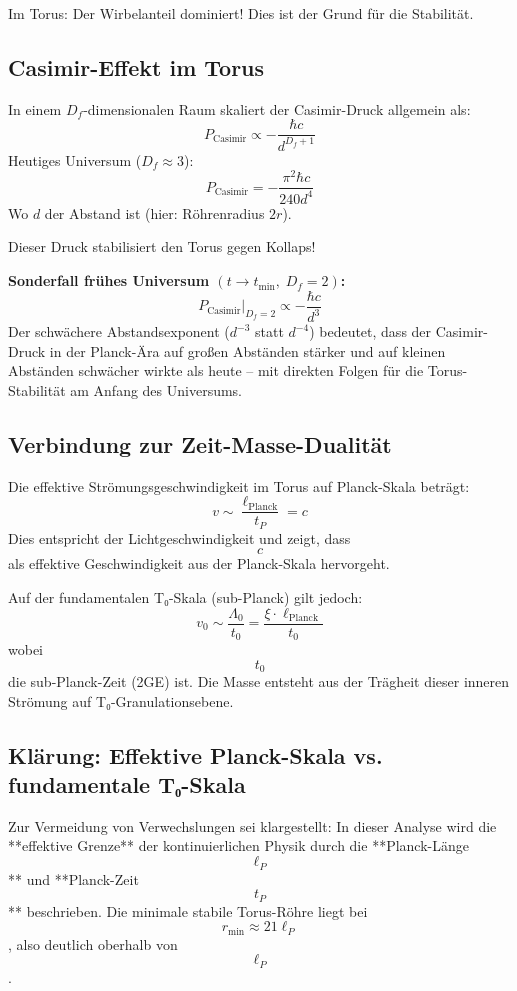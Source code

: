	Im Torus: Der Wirbelanteil dominiert! Dies ist der Grund für die Stabilität.
	
	\subsection{Casimir-Effekt im Torus}
	In einem $D_f$-dimensionalen Raum skaliert der Casimir-Druck allgemein als:
	\[
	P_{\text{Casimir}} \propto -\frac{\hbar c}{d^{D_f+1}}
	\]
	Heutiges Universum (\( D_f \approx 3 \)):
	\[
	P_{\text{Casimir}} = -\frac{\pi^2 \hbar c}{240 d^4}
	\]
	Wo \( d \) der Abstand ist (hier: Röhrenradius \( 2r \)).

	Dieser Druck stabilisiert den Torus gegen Kollaps!

	\textbf{Sonderfall frühes Universum \((t \to t_{\min},\; D_f = 2)\):}
	\[
	P_{\text{Casimir}}\big|_{D_f=2} \propto -\frac{\hbar c}{d^3}
	\]
	Der schwächere Abstandsexponent ($d^{-3}$ statt $d^{-4}$) bedeutet, dass der Casimir-Druck in der Planck-Ära auf großen Abständen stärker und auf kleinen Abständen schwächer wirkte als heute – mit direkten Folgen für die Torus-Stabilität am Anfang des Universums.

	\subsection{Verbindung zur Zeit-Masse-Dualität}
	Die effektive Strömungsgeschwindigkeit im Torus auf Planck-Skala beträgt:
	$$   
	v \sim \frac{\ell_{\text{Planck}}}{t_P} = c
	$$
	Dies entspricht der Lichtgeschwindigkeit und zeigt, dass $$   c   $$ als effektive Geschwindigkeit aus der Planck-Skala hervorgeht.
	
	Auf der fundamentalen T₀-Skala (sub-Planck) gilt jedoch:
	$$   
	v_0 \sim \frac{\Lambda_0}{t_0} = \frac{\xi \cdot \ell_{\text{Planck}}}{t_0}
	$$
	wobei $$   t_0   $$ die sub-Planck-Zeit (2GE) ist. Die Masse entsteht aus der Trägheit dieser inneren Strömung auf T₀-Granulationsebene.
	
	\subsection{Klärung: Effektive Planck-Skala vs. fundamentale T₀-Skala}
	Zur Vermeidung von Verwechslungen sei klargestellt: In dieser Analyse wird die **effektive Grenze** der kontinuierlichen Physik durch die **Planck-Länge $$   \ell_P   $$** und **Planck-Zeit $$   t_P   $$** beschrieben. Die minimale stabile Torus-Röhre liegt bei $$   r_{\min} \approx 21 \ell_P   $$, also deutlich oberhalb von $$   \ell_P   $$.
	
